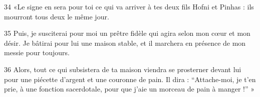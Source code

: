 
34 «Le signe en sera pour toi ce qui va arriver à tes deux fils Hofni et Pinhas : ils mourront tous deux le même jour.

35 Puis, je susciterai pour moi un prêtre fidèle qui agira selon mon cœur et mon désir. Je bâtirai pour lui une maison stable, et il marchera en présence de mon messie pour toujours.

36 Alors, tout ce qui subsistera de ta maison viendra se prosterner devant lui pour une piécette d’argent et une couronne de pain. Il dira : “Attache-moi, je t’en prie, à une fonction sacerdotale, pour que j’aie un morceau de pain à manger !” »